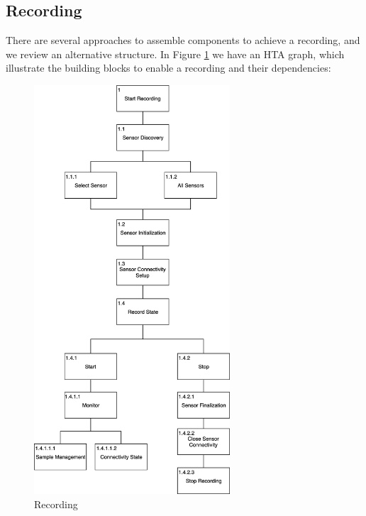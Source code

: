 
\subsection{Recording}
There are several approaches to assemble components to achieve a recording, and we review an alternative structure. In Figure \ref{fig:hta_recording} we have an HTA graph, which illustrate the building blocks to enable a recording and their dependencies:

\begin{figure}
    \centering
    \includegraphics[width=0.65\textwidth]{images/Recording.png}
    \caption{Recording}
    \label{fig:hta_recording}
\end{figure}

